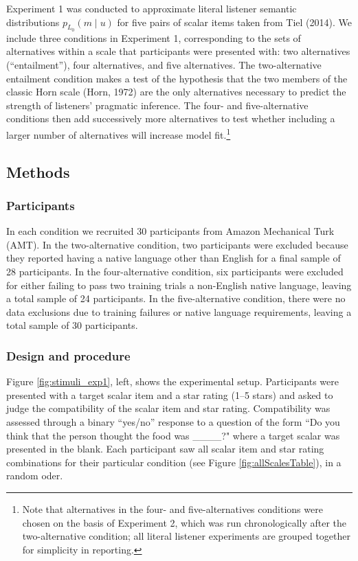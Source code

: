 \documentclass[10pt, letterpaper]{article}
\begin{document}
Experiment 1 was conducted to approximate literal listener semantic
distributions \(p_{L_0}(m \mid u)\) for five pairs of scalar items taken
from Tiel (2014). We include three conditions in Experiment 1,
corresponding to the sets of alternatives within a scale that
participants were presented with: two alternatives (``entailment''),
four alternatives, and five alternatives. The two-alternative entailment
condition makes a test of the hypothesis that the two members of the
classic Horn scale (Horn, 1972) are the only alternatives necessary to
predict the strength of listeners' pragmatic inference. The four- and
five-alternative conditions then add successively more alternatives to
test whether including a larger number of alternatives will increase
model
fit.\footnote{Note that alternatives in the four- and five-alternatives conditions were chosen on the basis of Experiment 2, which was run chronologically after the two-alternative condition; all literal listener experiments are grouped together for simplicity in reporting.}

\subsection{Methods}\label{methods}

\subsubsection{Participants}\label{participants}

In each condition we recruited 30 participants from Amazon Mechanical
Turk (AMT). In the two-alternative condition, two participants were
excluded because they reported having a native language other than
English for a final sample of 28 participants. In the four-alternative
condition, six participants were excluded for either failing to pass two
training trials a non-English native language, leaving a total sample of
24 participants. In the five-alternative condition, there were no data
exclusions due to training failures or native language requirements,
leaving a total sample of 30 participants.

\subsubsection{Design and procedure}\label{design-and-procedure}

Figure \ref{fig:stimuli_exp1}, left, shows the experimental setup.
Participants were presented with a target scalar item and a star rating
(1--5 stars) and asked to judge the compatibility of the scalar item and
star rating. Compatibility was assessed through a binary ``yes/no''
response to a question of the form ``Do you think that the person
thought the food was \_\_\_\_?" where a target scalar was presented in
the blank. Each participant saw all scalar item and star rating
combinations for their particular condition (see Figure
\ref{fig:allScalesTable}), in a random oder.
\end{document}
